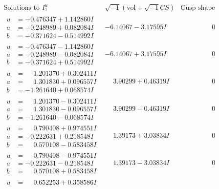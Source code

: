 \documentclass[1p]{elsarticle_modified}
\theoremstyle{definition}
\newcommand{\I}{\sqrt{-1}}
\begin{document}
$$\begin{array}{c|c|c}
\text{Solutions to }I^u_{1}& \I (\text{vol} + \sqrt{-1}CS) & \text{Cusp shape}\\
 \hline 
\begin{aligned}
u &= -0.476347 + 1.142860 I \\
a &= -0.248989 + 0.082084 I \\
b &= -0.371624 - 0.514992 I\end{aligned}
 & -6.14067 - 3.17595 I & \phantom{-0.000000 } 0 \\ \hline\begin{aligned}
u &= -0.476347 - 1.142860 I \\
a &= -0.248989 - 0.082084 I \\
b &= -0.371624 + 0.514992 I\end{aligned}
 & -6.14067 + 3.17595 I & \phantom{-0.000000 } 0 \\ \hline\begin{aligned}
u &= \phantom{-}1.201370 + 0.302411 I \\
a &= \phantom{-}1.301830 + 0.096557 I \\
b &= -1.261640 + 0.068574 I\end{aligned}
 & \phantom{-}3.90299 + 0.46319 I & \phantom{-0.000000 } 0 \\ \hline\begin{aligned}
u &= \phantom{-}1.201370 - 0.302411 I \\
a &= \phantom{-}1.301830 - 0.096557 I \\
b &= -1.261640 - 0.068574 I\end{aligned}
 & \phantom{-}3.90299 - 0.46319 I & \phantom{-0.000000 } 0 \\ \hline\begin{aligned}
u &= \phantom{-}0.790408 + 0.974551 I \\
a &= -0.222631 + 0.218548 I \\
b &= \phantom{-}0.570108 - 0.583458 I\end{aligned}
 & \phantom{-}1.39173 + 3.03834 I & \phantom{-0.000000 } 0 \\ \hline\begin{aligned}
u &= \phantom{-}0.790408 - 0.974551 I \\
a &= -0.222631 - 0.218548 I \\
b &= \phantom{-}0.570108 + 0.583458 I\end{aligned}
 & \phantom{-}1.39173 - 3.03834 I & \phantom{-0.000000 } 0 \\ \hline\begin{aligned}
u &= \phantom{-}0.652253 + 0.358586 I \\

\end{aligned}
\end{array}$$
\end{document}
